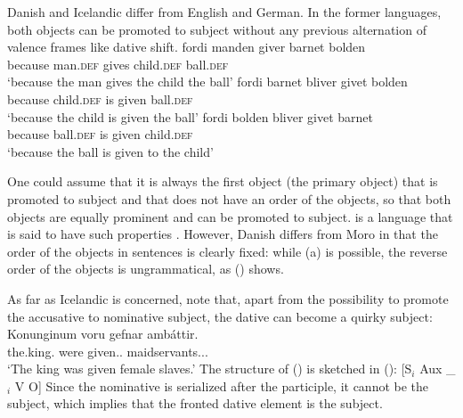 Danish and Icelandic differ from English and German. In the former languages, both objects can be
promoted to subject without any previous alternation of valence frames like dative shift.
\eal
\ex\label{ex-fordi-manden-giver-barnet-bolden} 
\gll fordi manden giver barnet bolden\\ 
     because man.\textsc{def} gives child.\textsc{def} ball.\textsc{def}\\\danish
\glt `because the man gives the child the ball'
\ex\label{ex-child-was-given-ball-danish}
\gll fordi barnet bliver givet bolden\\ 
     because child.\textsc{def} is given ball.\textsc{def}\\
\glt `because the child is given the ball'
\ex\label{ex-ball-was-given-child-danish}
\gll fordi bolden bliver givet barnet\\ 
     because ball.\textsc{def} is given child.\textsc{def}\\
\glt `because the ball is given to the child'
\zl

\noindent
One could assume that it is always the first object (the primary object) that is promoted to subject
and that  does not have an order of the objects, so that both objects are equally prominent
and can be promoted to subject.  is a language that is said to have such properties
\citep{AMM2017a-u}. However, Danish differs from Moro in that the order of the objects in sentences is
clearly fixed: while (a) is possible, the reverse order of the objects is ungrammatical, as
() shows.
\z

\largerpage
\noindent
As far as Icelandic is concerned, \citet*[]{ZMT85a} note that, apart from the possibility to
promote the accusative to nominative subject, the dative can become a quirky subject:
\ea
\label{ex-dat-subj-passive-ditransitive-icelandic}
\gll Konunginum voru gefnar ambáttir.\\
     the.king.\DAT{} were given.\F.\PL{} maidservants.\NOM.\F.\PL\\\icelandic
\glt `The king was given female slaves.'
\z
The structure of () is sketched in ():
\ea
\label{sub-aux-v-o}
{}[S$_i$ Aux \_$_i$ V O] 
\z
Since the nominative is serialized after the participle, it cannot be the subject, which implies that
the fronted dative element is the subject.

